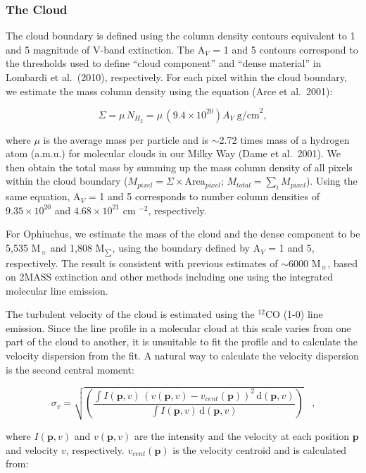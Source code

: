 \documentclass[11pt,a4paper]{emulateapj}
\begin{document}
\subsubsection{The Cloud}
The cloud boundary is defined using the column density contours equivalent to 1 and 5 magnitude of V-band extinction. The A$_V$ = 1 and 5 contours correspond to the thresholds used to define ``cloud component'' and ``dense material'' in Lombardi et al.\ (2010), respectively. For each pixel within the cloud boundary, we estimate the mass column density using the equation (Arce et al.\ 2001):

\begin{equation}
\Sigma = \mu\,N_{H_2} = \mu\,(9.4\times10^{20})A_V\;\text{g/cm}^2,
\end{equation}

where $\mu$ is the average mass per particle and is $\sim$2.72 times mass of a hydrogen atom (a.m.u.) for molecular clouds in our Milky Way (Dame et al.\ 2001). We then obtain the total mass by summing up the mass column density of all pixels within the cloud boundary ($M_{pixel} = \Sigma\times \text{Area}_{pixel}$; $M_{total} = \sum_{i}M_{pixel}$). Using the same equation, A$_V$ = 1 and 5 corresponds to number column densities of $9.35 \times 10^{20}$ and $4.68 \times 10^{21}$ cm $^{-2}$, respectively.

For Ophiuchus, we estimate the mass of the cloud and the dense component to be 5,535 M$_{\sun}$ and 1,808 M$_{\sum}$, using the boundary defined by A$_V$ = 1 and 5, respectively. The result is consistent with previous estimates of $\sim$6000 M$_{\sun}$, based on 2MASS extinction and other methods including one using the integrated molecular line emission.

The turbulent velocity of the cloud is estimated using the $^{12}$CO (1-0) line emission. Since the line profile in a molecular cloud at this scale varies from one part of the cloud to another, it is unsuitable to fit the profile and to calculate the velocity dispersion from the fit. A natural way to calculate the velocity dispersion is the second central moment:

\begin{equation}
\sigma_v = \sqrt{\left(\frac{\int{I(\mathbf{p}, v)\,(v(\mathbf{p}, v)-v_{cent}(\mathbf{p}))^2\,\text{d}(\mathbf{p}, v)}}{\int{I(\mathbf{p}, v)}\,\text{d}(\mathbf{p}, v)}\right)}\;\;\;\text{,}
\end{equation}

where $I(\mathbf{p}, v)$ and $v(\mathbf{p}, v)$ are the intensity and the velocity at each position $\mathbf{p}$ and velocity $v$, respectively. $v_{cent}(\mathbf{p})$ is the velocity centroid and is calculated from:
\end{document}
